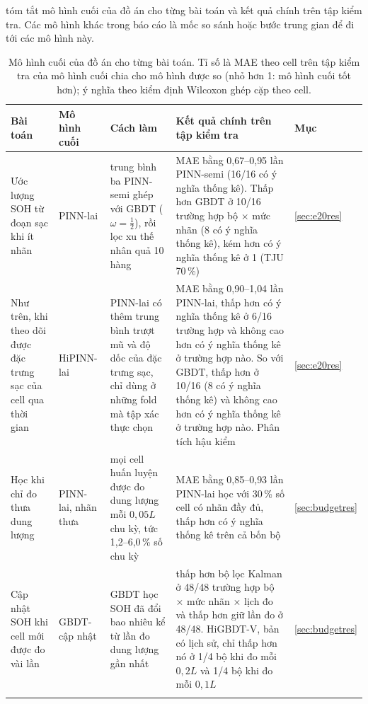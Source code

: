  tóm tắt mô hình cuối của đồ án cho từng bài toán và kết quả chính trên tập kiểm tra. Các mô hình khác trong báo cáo là mốc so sánh hoặc bước trung gian để đi tới các mô hình này.
\begin{table}[!htbp]\centering\footnotesize
\caption[Mô hình cuối của đồ án cho từng bài toán]{Mô hình cuối của đồ án cho từng bài toán. Tỉ số là MAE theo cell trên tập kiểm tra của mô hình cuối chia cho mô hình được so (nhỏ hơn 1: mô hình cuối tốt hơn); ý nghĩa theo kiểm định Wilcoxon ghép cặp theo cell.}\label{tab:final}
\setlength{\tabcolsep}{4pt}\begin{tabularx}{\textwidth}{>{\raggedright\arraybackslash}p{2.0cm}>{\raggedright\arraybackslash}p{1.6cm}>{\raggedright\arraybackslash}p{3.3cm}>{\raggedright\arraybackslash}Xl}\toprule
Bài toán & Mô hình cuối & Cách làm & Kết quả chính trên tập kiểm tra & Mục \\\midrule
Ước lượng SOH từ đoạn sạc khi ít nhãn & PINN-lai & trung bình ba PINN-semi ghép với GBDT ($\omega = \tfrac12$), rồi lọc xu thế nhân quả 10 hàng & MAE bằng 0{,}67--0{,}95 lần PINN-semi (16/16 có ý nghĩa thống kê). Thấp hơn GBDT ở 10/16 trường hợp bộ $\times$ mức nhãn (8 có ý nghĩa thống kê), kém hơn có ý nghĩa thống kê ở 1 (TJU 70\,\%) & \ref{sec:e20res} \\\addlinespace
Như trên, khi theo dõi được đặc trưng sạc của cell qua thời gian & HiPINN-lai & PINN-lai có thêm trung bình trượt mũ và độ dốc của đặc trưng sạc, chỉ dùng ở những fold mà tập xác thực chọn & MAE bằng 0{,}90--1{,}04 lần PINN-lai, thấp hơn có ý nghĩa thống kê ở 6/16 trường hợp và không cao hơn có ý nghĩa thống kê ở trường hợp nào. So với GBDT, thấp hơn ở 10/16 (8 có ý nghĩa thống kê) và không cao hơn có ý nghĩa thống kê ở trường hợp nào. Phân tích hậu kiểm & \ref{sec:e20res} \\\addlinespace
Học khi chỉ đo thưa dung lượng & PINN-lai, nhãn thưa & mọi cell huấn luyện được đo dung lượng mỗi $0{,}05L$ chu kỳ, tức 1{,}2--6{,}0\,\% số chu kỳ & MAE bằng 0{,}85--0{,}93 lần PINN-lai học với 30\,\% số cell có nhãn đầy đủ, thấp hơn có ý nghĩa thống kê trên cả bốn bộ & \ref{sec:budgetres} \\\addlinespace
Cập nhật SOH khi cell mới được đo vài lần & GBDT-cập nhật & GBDT học SOH đã đổi bao nhiêu kể từ lần đo dung lượng gần nhất & thấp hơn bộ lọc Kalman ở 48/48 trường hợp bộ $\times$ mức nhãn $\times$ lịch đo và thấp hơn giữ lần đo ở 48/48. HiGBDT-V, bản có lịch sử, chỉ thấp hơn nó ở 1/4 bộ khi đo mỗi $0{,}2L$ và 1/4 bộ khi đo mỗi $0{,}1L$ & \ref{sec:budgetres} \\\addlinespace

\end{tabularx}
\end{table}
